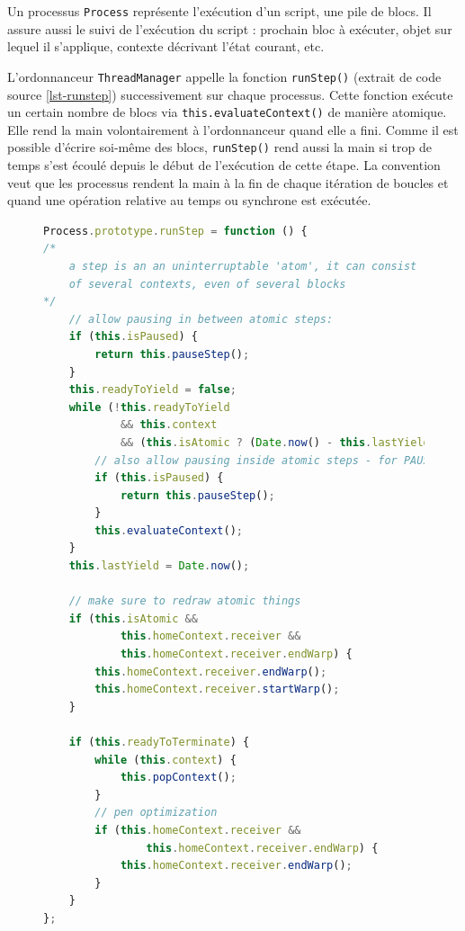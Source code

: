Un processus \texttt{Process} représente l'exécution d'un \gls{script}, une pile de \glspl{bloc}. Il assure aussi le suivi de l'exécution du \gls{script} : prochain \gls{bloc} à exécuter, objet sur lequel il s'applique, contexte décrivant l'état courant, etc.

L'ordonnanceur \texttt{ThreadManager} appelle la fonction \texttt{runStep()} (extrait de code source \ref{lst-runstep}) successivement sur chaque processus. Cette fonction exécute un certain nombre de \glspl{bloc} via \texttt{this.evaluateContext()} de manière atomique. Elle rend la main volontairement à l'ordonnanceur quand elle a fini. Comme il est possible d'écrire soi-même des \glspl{bloc}, \texttt{runStep()} rend aussi la main si trop de temps s'est écoulé depuis le début de l'exécution de cette étape. La convention veut que les processus rendent la main à la fin de chaque itération de boucles et quand une opération relative au temps ou synchrone est exécutée.
\begin{figure}
\begin{lstlisting}[caption={Fonction \texttt{runStep()} de \texttt{Process}},label=lst-runstep,language=JavaScript]
Process.prototype.runStep = function () {
/*
    a step is an an uninterruptable 'atom', it can consist
    of several contexts, even of several blocks
*/
    // allow pausing in between atomic steps:
    if (this.isPaused) {
        return this.pauseStep();
    }
    this.readyToYield = false;
    while (!this.readyToYield
            && this.context
            && (this.isAtomic ? (Date.now() - this.lastYield < this.timeout) : true) ) {
        // also allow pausing inside atomic steps - for PAUSE block primitive:
        if (this.isPaused) {
            return this.pauseStep();
        }
        this.evaluateContext();
    }
    this.lastYield = Date.now();

    // make sure to redraw atomic things
    if (this.isAtomic &&
            this.homeContext.receiver &&
            this.homeContext.receiver.endWarp) {
        this.homeContext.receiver.endWarp();
        this.homeContext.receiver.startWarp();
    }

    if (this.readyToTerminate) {
        while (this.context) {
            this.popContext();
        }
        // pen optimization
        if (this.homeContext.receiver &&
                this.homeContext.receiver.endWarp) {
            this.homeContext.receiver.endWarp();
        }
    }
};
\end{lstlisting}
\end{figure}


